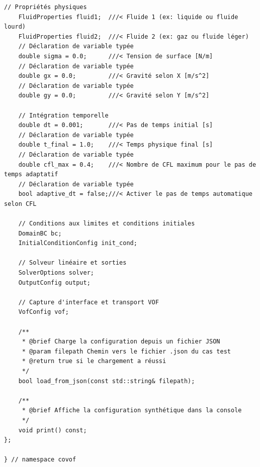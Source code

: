 \documentclass[10pt,a4paper,oneside]{book}
\begin{document}
\begin{lstlisting}[language={[11]C++}]
    // Propriétés physiques
    FluidProperties fluid1;  ///< Fluide 1 (ex: liquide ou fluide lourd)
    FluidProperties fluid2;  ///< Fluide 2 (ex: gaz ou fluide léger)
    // Déclaration de variable typée
    double sigma = 0.0;      ///< Tension de surface [N/m]
    // Déclaration de variable typée
    double gx = 0.0;         ///< Gravité selon X [m/s^2]
    // Déclaration de variable typée
    double gy = 0.0;         ///< Gravité selon Y [m/s^2]

    // Intégration temporelle
    double dt = 0.001;       ///< Pas de temps initial [s]
    // Déclaration de variable typée
    double t_final = 1.0;    ///< Temps physique final [s]
    // Déclaration de variable typée
    double cfl_max = 0.4;    ///< Nombre de CFL maximum pour le pas de temps adaptatif
    // Déclaration de variable typée
    bool adaptive_dt = false;///< Activer le pas de temps automatique selon CFL

    // Conditions aux limites et conditions initiales
    DomainBC bc;
    InitialConditionConfig init_cond;

    // Solveur linéaire et sorties
    SolverOptions solver;
    OutputConfig output;

    // Capture d'interface et transport VOF
    VofConfig vof;

    /**
     * @brief Charge la configuration depuis un fichier JSON
     * @param filepath Chemin vers le fichier .json du cas test
     * @return true si le chargement a réussi
     */
    bool load_from_json(const std::string& filepath);

    /**
     * @brief Affiche la configuration synthétique dans la console
     */
    void print() const;
};

} // namespace covof

\end{lstlisting}
\end{document}
